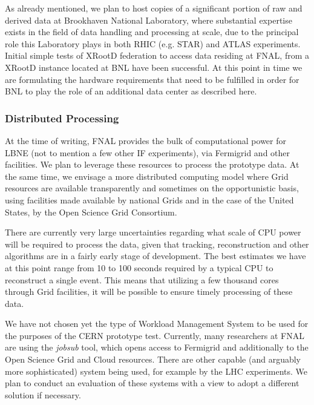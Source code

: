 As already mentioned, we plan to host copies of a significant portion of raw and derived data at Brookhaven National Laboratory, where substantial expertise
exists in the field of data handling and processing at scale, due to the principal role this Laboratory plays in both RHIC (e.g. STAR) and ATLAS experiments.
Initial simple tests of XRootD federation to access data residing at FNAL, from a XRootD instance located at BNL have been successful. At this point in time we
are formulating the hardware requirements that need to be fulfilled in order for BNL to play the role of an additional data center as described here.


\subsubsection{Distributed Processing}
At the time of writing, FNAL provides the bulk of computational power for LBNE (not to mention a few other IF experiments), via Fermigrid and other facilities.
We plan to leverage these resources to process the prototype data. At the same time, we envisage a more distributed computing model where Grid resources
are available transparently and sometimes on the opportunistic basis, using facilities made available by national Grids and in the case of the United States, by
the Open Science Grid Consortium.

There are currently very large uncertainties regarding what scale of CPU power will be required to process the data, given that tracking, reconstruction and
other algorithms are in a fairly early stage of development. The best estimates we have at this point range from 10 to 100 seconds required by a typical
CPU to reconstruct a single event. This means that utilizing a few thousand cores through Grid facilities, it will be possible to ensure timely processing of these data.

We have not chosen yet the type of Workload Management System to be used for the purposes of the CERN prototype test. Currently, many researchers at FNAL
are using the \textit{jobsub} tool, which opens access to Fermigrid and additionally to the Open Science Grid and Cloud resources. There are other capable (and arguably
more sophisticated) system being used, for example by the LHC experiments. We plan to conduct an evaluation of these systems with a view to adopt a different
solution if necessary.



%

